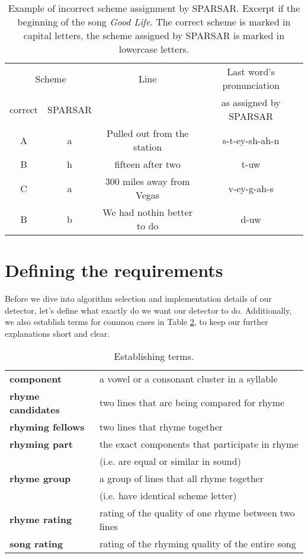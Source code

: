 \begin{table}[h!]
	\centering
	\begin{tabular}{@{}c c c c@{}}\toprule
		\multicolumn{2}{c}{Scheme} & Line & Last word's pronunciation \\\cmidrule{1-2}
 		correct & SPARSAR & & as assigned by SPARSAR  \\
		\midrule
		A & a & Pulled out from the station & s-t-ey-sh-ah-n \\ 
		B & h & fifteen after two & t-uw \\
		C & a &	300 miles away from Vegas & v-ey-g-ah-s\\
		B & b & We had nothin better to do & d-uw\\
		\bottomrule
	\end{tabular}
	\caption[Example of incorrect scheme assignment by SPARSAR. Excerpt from the song \textit{Good Life}]{Example of incorrect scheme assignment by SPARSAR. Excerpt if the beginning of the song \textit{Good Life}. The correct scheme is marked in capital letters,	the scheme assigned by SPARSAR is marked in lowercase letters. }
\label{sparsar_wrong_scheme}
\end{table}


\section{Defining the requirements}\label{defining_the_requirements}
Before we dive into algorithm selection and implementation details of our detector, let's define what exactly do we want our detector to do. Additionally, we also establish terms for common cases in Table \ref{terms}, to keep our further explanations short and clear.
\begin{table}[h!]
	\centering
	\begin{tabular}{>{\bfseries}l l} 
		component & a vowel or a consonant cluster in a syllable\\
		rhyme candidates & two lines that are being compared for rhyme \\
		rhyming fellows & two lines that rhyme together\\
		rhyming part & the exact components that participate in rhyme \\&(i.e. are equal or similar in sound)\\
		rhyme group & a group of lines that all rhyme together\\& (i.e. have identical scheme letter) \\
		rhyme rating & rating of the quality of one rhyme between two lines\\
		song rating & rating of the rhyming quality of the entire song\\
	\end{tabular}
	\caption{Establishing terms.}
	\label{terms}
\end{table}

